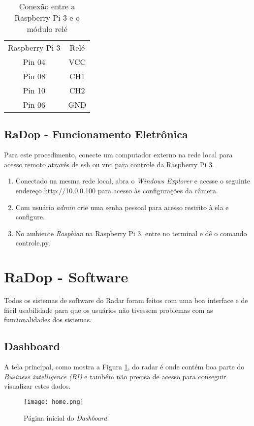 \begin{table}[H]
\centering
\caption{Conexão entre a Raspberry Pi 3 e o módulo relé}
\begin{tabular}{cc}
Raspberry Pi 3 & Relé \\
Pin 04         & VCC  \\
Pin 08         & CH1  \\
Pin 10         & CH2  \\
Pin 06         & GND 
\end{tabular}

\label{mon}
\end{table}


\subsection{RaDop - Funcionamento Eletrônica}
Para este procedimento, conecte um computador externo na rede local para acesso remoto através de ssh ou vnc para controle da Raspberry Pi 3.
  \begin{enumerate} 
\item Conectado na mesma rede local, abra o \emph{Windows Explorer} e acesse o seguinte endereço http://10.0.0.100 para acesso às configurações da câmera.
\item Com usuário \emph{admin} crie uma senha pessoal para acesso restrito à ela e configure.
\item No ambiente \emph{Raspbian} na Raspberry Pi 3, entre no terminal e dê o comando controle.py.
\end{enumerate}

\section{RaDop - Software}

Todos os sistemas de software do Radar foram feitos com uma boa interface e de fácil usabilidade para que os usuários não tivessem problemas com as funcionalidades dos sistemas. 

\subsection{Dashboard}

A tela principal, como mostra a Figura \ref{home}, do radar é onde contém boa parte do \textit{Business intelligence (BI)} e também não precisa de acesso para conseguir visualizar estes dados.


  \begin{figure}[H]
     \centering
     \texttt{[image: home.png]}
     \caption{Página inicial do \textit{Dashboard}.}
     \label{home}
 \end{figure}

